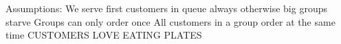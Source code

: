 Assumptions\+: We serve first customers in queue always otherwise big groups starve Groups can only order once All customers in a group order at the same time C\+U\+S\+T\+O\+M\+E\+RS L\+O\+VE E\+A\+T\+I\+NG P\+L\+A\+T\+ES 